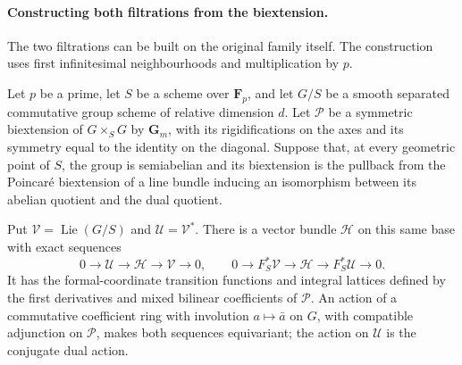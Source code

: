 \paragraph{Constructing both filtrations from the biextension.}
The two filtrations can be built on the original family itself.
The construction uses first infinitesimal neighbourhoods and
multiplication by $p$.

\begin{theorem}\label{geo-biextension-conjugate-filtration}
Let $p$ be a prime, let $S$ be a scheme over $\mathbf F_p$,
and let $G/S$ be a
smooth separated commutative group scheme of relative dimension $d$.
Let $\mathcal P$ be a symmetric biextension of $G\times_S G$ by
$\mathbf G_m$, with its rigidifications on the axes and its symmetry
equal to the identity on the diagonal.
Suppose that, at every geometric point of $S$, the group is
semiabelian and its biextension is the pullback from the Poincar\'e
biextension of a line bundle inducing an isomorphism between its
abelian quotient and the dual quotient.

Put $\mathcal V=\operatorname{Lie}(G/S)$ and
$\mathcal U=\mathcal V^*$.
There is a vector bundle $\mathcal H$ on this same base with exact
sequences
\begin{equation}\label{geo-actual-two-filtrations}
 0\longrightarrow\mathcal U\longrightarrow\mathcal H
       \longrightarrow\mathcal V\longrightarrow0,\qquad
 0\longrightarrow F_S^*\mathcal V\longrightarrow\mathcal H
       \longrightarrow F_S^*\mathcal U\longrightarrow0.
\end{equation}
It has the formal-coordinate transition functions and integral
lattices defined by the first derivatives and mixed bilinear
coefficients of $\mathcal P$.
An action of a commutative coefficient ring with involution
$a\mapsto\bar a$ on $G$, with compatible adjunction on $\mathcal P$,
makes both sequences equivariant; the action on $\mathcal U$ is
the conjugate dual action.
\end{theorem}
